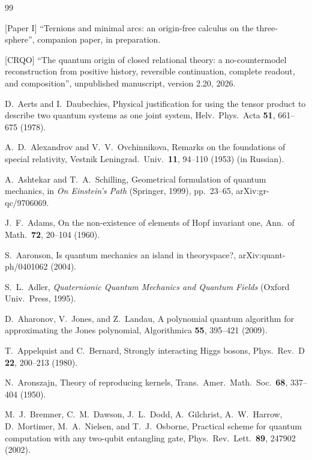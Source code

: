 \documentclass[aps,pra,onecolumn,superscriptaddress,nofootinbib,10pt]{revtex4-2}
\theoremstyle{definition}
\theoremstyle{remark}
\begin{document}
\begin{thebibliography}{99}\footnotesize

 [Paper I] ``Ternions and minimal arcs: an origin-free calculus on the three-sphere'', companion paper, in preparation.

 [CRQO] ``The quantum origin of closed relational theory: a no-countermodel reconstruction from positive history, reversible continuation, complete readout, and composition'', unpublished manuscript, version 2.20, 2026.

 D.~Aerts and I.~Daubechies, Physical justification for using the tensor product to describe two quantum systems as one joint system, Helv.\ Phys.\ Acta \textbf{51}, 661--675 (1978).

 A.~D.~Alexandrov and V.~V.~Ovchinnikova, Remarks on the foundations of special relativity, Vestnik Leningrad.\ Univ.\ \textbf{11}, 94--110 (1953) (in Russian). %

 A.~Ashtekar and T.~A.~Schilling, Geometrical formulation of quantum mechanics, in \emph{On Einstein's Path} (Springer, 1999), pp.~23--65, arXiv:gr-qc/9706069.

 J.~F.~Adams, On the non-existence of elements of Hopf invariant one, Ann.\ of Math.\ \textbf{72}, 20--104 (1960).

 S.~Aaronson, Is quantum mechanics an island in theoryspace?, arXiv:quant-ph/0401062 (2004).

 S.~L.~Adler, \emph{Quaternionic Quantum Mechanics and Quantum Fields} (Oxford Univ.\ Press, 1995).

 D.~Aharonov, V.~Jones, and Z.~Landau, A polynomial quantum algorithm for approximating the Jones polynomial, Algorithmica \textbf{55}, 395--421 (2009).

 T.~Appelquist and C.~Bernard, Strongly interacting Higgs bosons, Phys.\ Rev.\ D \textbf{22}, 200--213 (1980).

 N.~Aronszajn, Theory of reproducing kernels, Trans.\ Amer.\ Math.\ Soc.\ \textbf{68}, 337--404 (1950).

 M.~J.~Bremner, C.~M.~Dawson, J.~L.~Dodd, A.~Gilchrist, A.~W.~Harrow, D.~Mortimer, M.~A.~Nielsen, and T.~J.~Osborne, Practical scheme for quantum computation with any two-qubit entangling gate, Phys.\ Rev.\ Lett.\ \textbf{89}, 247902 (2002).


\end{thebibliography}
\end{document}
